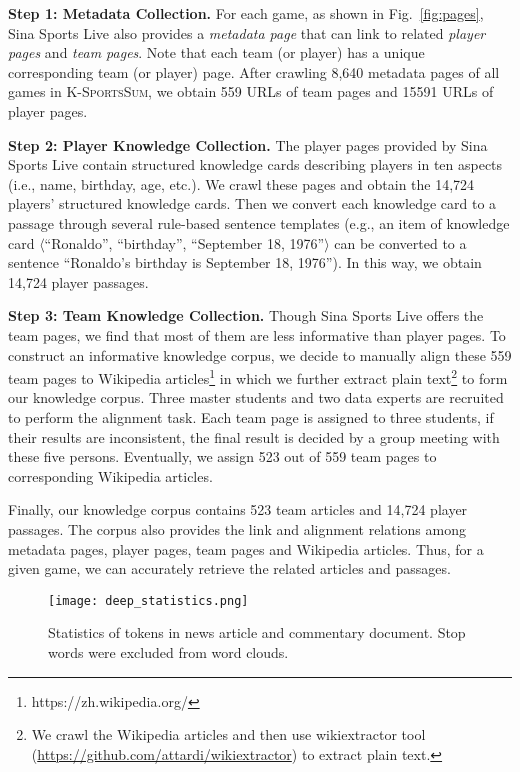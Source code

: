 \vspace{1ex}
\noindent\textbf{Step 1: Metadata Collection.}
For each game, as shown in Fig.~\ref{fig:pages}, Sina Sports Live also provides a \emph{metadata page} that can link to related \emph{player pages} and \emph{team pages}. Note that each team (or player) has a unique corresponding team (or player) page.
After crawling 8,640 metadata pages of all games in \textsc{K-SportsSum}, we obtain 559 URLs of team pages and 15591 URLs of player pages.

\vspace{1ex}
\noindent\textbf{Step 2: Player Knowledge Collection.}
The player pages provided by Sina Sports Live contain structured knowledge cards describing players in ten aspects (i.e., name, birthday, age, etc.).
We crawl these pages and obtain the 14,724 players' structured knowledge cards.
Then we convert each knowledge card to a passage through several rule-based sentence templates (e.g., an item of knowledge card $\langle$``Ronaldo'', ``birthday'', ``September 18, 1976''$\rangle$ can be converted to a sentence ``Ronaldo's birthday is September 18, 1976''). In this way, we obtain 14,724 player passages.

\vspace{1ex}
\noindent\textbf{Step 3: Team Knowledge Collection.}
Though Sina Sports Live offers the team pages, we find that most of them are less informative than player pages. To construct an informative knowledge corpus, we decide to manually align these 559 team pages to Wikipedia articles\footnote{https://zh.wikipedia.org/} in which we further extract plain text\footnote{We crawl the Wikipedia articles and then use wikiextractor tool (\url{https://github.com/attardi/wikiextractor}) to extract plain text.} to form our knowledge corpus.
Three master students and two data experts are recruited to perform the alignment task. Each team page is assigned to three students, if their results are inconsistent, the final result is decided by a group meeting with these five persons. Eventually, we assign 523 out of 559 team pages to corresponding Wikipedia articles.

Finally, our knowledge corpus contains 523 team articles and 14,724 player passages. The corpus also provides the link and alignment relations among metadata pages, player pages, team pages and Wikipedia articles. Thus, for a given game, we can accurately retrieve the related articles and passages.

\begin{figure}[t]
\setlength{\belowcaptionskip}{-10pt}
  \centerline{\texttt{[image: deep\_statistics.png]}}
  \caption{Statistics of tokens in news article and commentary document. Stop words were excluded from word clouds.}
  \label{fig:deep_statistics}
\end{figure} 

